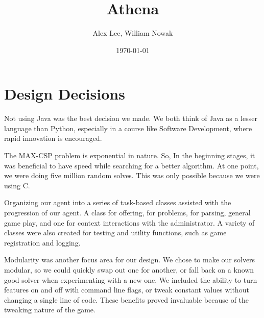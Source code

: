 \documentclass[letterpaper,12pt,oneside]{article}
\title{Athena}
\author{Alex Lee, William Nowak}
\date{\today}
\begin{document}
\maketitle



\section{Design Decisions}

Not using Java was the best decision we made. We both think of Java as a
lesser language than Python, especially in a course like Software Development,
where rapid innovation is encouraged.

The MAX-CSP problem is exponential in nature. So, In the beginning
stages, it was beneficial to have speed while searching for a better
algorithm. At one point, we were doing five million random solves. This
was only possible because we were using C.

Organizing our agent into a series of task-based classes assisted with the
progression of our agent. A class for offering, for problems, for parsing,
general game play, and one for context interactions with the administrator.
A variety of classes were also created for testing and utility functions, such
as game registration and logging.

Modularity was another focus area for our design. We chose to make our solvers
modular, so we could quickly swap out one for another, or fall back on a known
good solver when experimenting with a new one. We included the ability to turn
features on and off with command line flags, or tweak constant values without
changing a single line of code. These benefits proved invaluable because of the
tweaking nature of the game.

\end{document}
